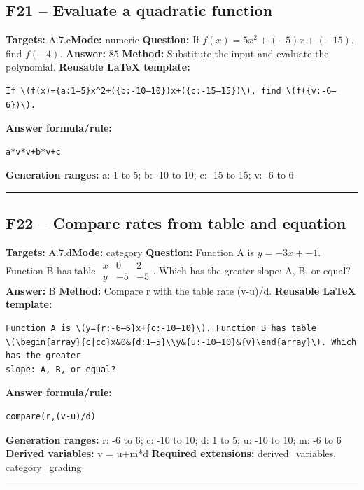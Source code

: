 \documentclass[11pt]{article}
\begin{document}
\subsection{F21 -- Evaluate a quadratic function}
\textbf{Targets:} A.7.c\quad\textbf{Mode:} numeric
\textbf{Question:} If \(f(x)=5x^2+(-5)x+(-15)\), find \(f(-4)\).
\textbf{Answer:} \(85\)
\textbf{Method:} Substitute the input and evaluate the polynomial.
\textbf{Reusable LaTeX template:}
\begin{verbatim}
If \(f(x)={a:1–5}x^2+({b:-10–10})x+({c:-15–15})\), find \(f({v:-6–6})\).
\end{verbatim}
\textbf{Answer formula/rule:}
\begin{verbatim}
a*v*v+b*v+c
\end{verbatim}
\textbf{Generation ranges:} a: 1 to 5; b: -10 to 10; c: -15 to 15; v: -6 to 6
\medskip\hrule\medskip
\subsection{F22 -- Compare rates from table and equation}
\textbf{Targets:} A.7.d\quad\textbf{Mode:} category
\textbf{Question:} Function A is \(y=-3x+-1\). Function B has table \(\begin{array}{c|cc}x&0&2\\y&-5&-5\end{array}\). Which has the greater slope: A, B, or equal?
\textbf{Answer:} \(\text{B}\)
\textbf{Method:} Compare r with the table rate (v-u)/d.
\textbf{Reusable LaTeX template:}
\begin{verbatim}
Function A is \(y={r:-6–6}x+{c:-10–10}\). Function B has table
\(\begin{array}{c|cc}x&0&{d:1–5}\\y&{u:-10–10}&{v}\end{array}\). Which has the greater
slope: A, B, or equal?
\end{verbatim}
\textbf{Answer formula/rule:}
\begin{verbatim}
compare(r,(v-u)/d)
\end{verbatim}
\textbf{Generation ranges:} r: -6 to 6; c: -10 to 10; d: 1 to 5; u: -10 to 10; m: -6 to 6
\textbf{Derived variables:} v = u+m*d
\textbf{Required extensions:} derived\_variables, category\_grading
\medskip\hrule\medskip
\end{document}
